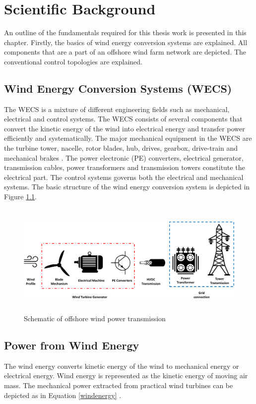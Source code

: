 \chapter{Scientific Background}\label{2}
An outline of the fundamentals required for this thesis work is presented in this chapter. Firstly, the basics of wind energy conversion systems are explained. All components that are a part of an offshore wind farm network are depicted. The conventional control topologies are explained.

\section{Wind Energy Conversion Systems (WECS)}\label{WECS_theory}
The \gls{WECS} is a mixture of different engineering fields such as mechanical, electrical and control systems. The \gls{WECS} consists of several components that convert the kinetic energy of the wind into electrical energy and transfer power efficiently and systematically. The major mechanical equipment in the \gls{WECS} are the turbine tower, nacelle, rotor blades, hub, drives, gearbox, drive-train and mechanical brakes \cite{manwell2010wind}. The power electronic (\gls{PE}) converters, electrical generator, transmission cables, power transformers and transmission towers constitute the electrical part. The control systems \cite{yaramasu_high-power_2015} governs both the electrical and mechanical systems.
The basic structure of the wind energy conversion system is depicted in Figure \ref{fig:WECS}.   

\begin{figure}[H]
\centering
    \includegraphics[height = 5.5cm,width = 15.5cm]{Diagrams/Chapter_2/WECS.pdf}
    \caption{Schematic of offshore wind power transmission}
    \label{fig:WECS}
\end{figure}

\section{Power from Wind Energy} 
The wind energy converts kinetic energy of the wind to mechanical energy or electrical energy. Wind energy is represented as the kinetic energy of moving air mass. The mechanical power extracted from practical wind turbines can be depicted as in Equation \ref{windenergy} \cite{ali_wind_2012}.

